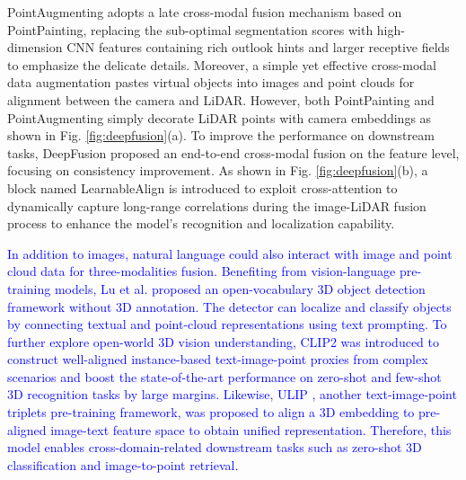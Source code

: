 \documentclass[a4paper,fleqn]{cas-dc}
\begin{document}
PointAugmenting \citep{wang2021pointaugmenting} adopts a late cross-modal fusion mechanism based on PointPainting, replacing the sub-optimal segmentation scores with high-dimension CNN features containing rich outlook hints and larger receptive fields to emphasize the delicate details. Moreover, a simple yet effective cross-modal data augmentation pastes virtual objects into images and point clouds for alignment between the camera and LiDAR. However, both PointPainting and PointAugmenting simply decorate LiDAR points with camera embeddings as shown in Fig. \ref{fig:deepfusion}(a). To improve the performance on downstream tasks, DeepFusion \citep{li2022deepfusion} proposed an end-to-end cross-modal fusion on the feature level, focusing on consistency improvement. As shown in Fig. \ref{fig:deepfusion}(b), a block named LearnableAlign is introduced to exploit cross-attention to dynamically capture long-range correlations during the image-LiDAR fusion process to enhance the model's recognition and localization capability.

\textcolor{blue}{In addition to images, natural language could also interact with image and point cloud data for three-modalities fusion. Benefiting from vision-language pre-training models, Lu et al. \citep{lu2023open} proposed an open-vocabulary 3D object detection framework without 3D annotation. The detector can localize and classify objects by connecting textual and point-cloud representations using text prompting. To further explore open-world 3D vision understanding, CLIP2 \citep{zeng2023clip2} was introduced to construct well-aligned instance-based text-image-point proxies from complex scenarios and boost the state-of-the-art performance on zero-shot and few-shot 3D recognition tasks by large margins. Likewise, ULIP \citep{xue2023ulip}, another text-image-point triplets pre-training framework, was proposed to align a 3D embedding to pre-aligned image-text feature space to obtain unified representation. Therefore, this model enables cross-domain-related downstream tasks such as zero-shot 3D classification and image-to-point retrieval.}
\end{document}

